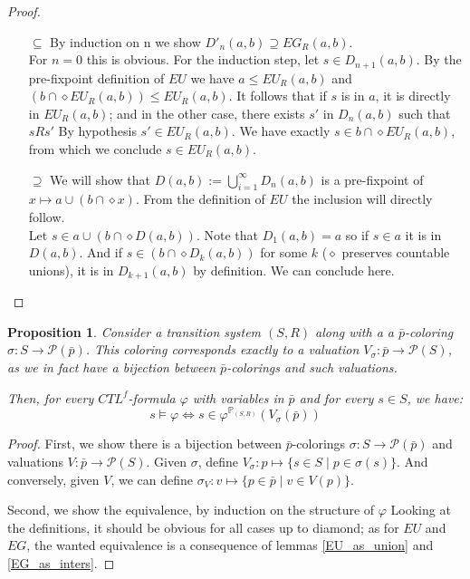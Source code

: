 \documentclass[11pt]{article}
\newtheorem{proposition}[definition]{Proposition}
\begin{document}
\begin{proof}
    \begin{itemize}
        \item[$\subseteq$] By induction on n we show $D'_n(a,b) \supseteq EG_R(a,b)$.\\ For $n=0$ this is obvious. For the induction step, let $s\in D_{n+1}(a,b)$. By the pre-fixpoint definition of $EU$ we have $a\leq EU_R(a,b)$ and $(b\cap\diamond EU_R(a,b))\leq EU_R(a,b)$. It follows that if $s$ is in $a$, it is directly in $EU_R(a,b)$; and in the other case, there exists $s'$ in $D_n(a,b)$ such that $sRs'$ By hypothesis $s'\in EU_R(a,b)$. We have exactly $s\in b\cap\diamond EU_R(a,b)$, from which we conclude $s\in EU_R(a,b)$.
        \item[$\supseteq$] We will show that $D(a,b) := \bigcup_{i=1}^{\infty}D_n(a,b)$ is a pre-fixpoint of $x \mapsto a \cup (b \cap \diamond x)$. From the definition of $EU$ the inclusion will directly follow.\\ Let $s\in a \cup (b \cap \diamond D(a,b))$. Note that $D_1(a,b)=a$ so if $s\in a$ it is in $D(a,b)$. And if $s\in (b \cap \diamond D_k(a,b))$ for some $k$ ($\diamond$ preserves countable unions), it is in $D_{k+1}(a,b)$ by definition. We can conclude here.
    \end{itemize}
\end{proof}

\begin{proposition}\label{equiv_complex_alg}
    Consider a transition system $(S,R)$ along with a a $\bar{p}$-coloring $\sigma : S \to \mathcal{P}(\bar{p})$. This coloring corresponds exactly to a valuation $V_\sigma:\bar{p}\to \mathcal{P}(S)$, as we in fact have a bijection between $\bar{p}$-colorings and such valuations.

    Then, for every $CTL^f$-formula $\varphi$ with variables in $\bar{p}$ and for every $s\in S$, we have: \[s\models\varphi \Longleftrightarrow s\in\varphi^{\mathbb{P}_{(S,R)}}(V_\sigma(\bar{p}))\]
\end{proposition}

\begin{proof}
    First, we show there is a bijection between $\bar{p}$-colorings $\sigma:S \to \mathcal{P}(\bar{p})$ and valuations $V:\bar{p}\to \mathcal{P}(S)$. Given $\sigma$, define $V_\sigma: p\mapsto\{s\in S \mid p\in \sigma(s)\}$. And conversely, given $V$, we can define $\sigma_V: v\mapsto\{p\in\bar{p}\mid v\in V(p)\}$.

    Second, we show the equivalence, by induction on the structure of $\varphi$ Looking at the definitions, it should be obvious for all cases up to diamond; as for $EU$ and $EG$, the wanted equivalence is a consequence of lemmas \ref{EU_as_union} and \ref{EG_as_inters}.
\end{proof}
\end{document}
